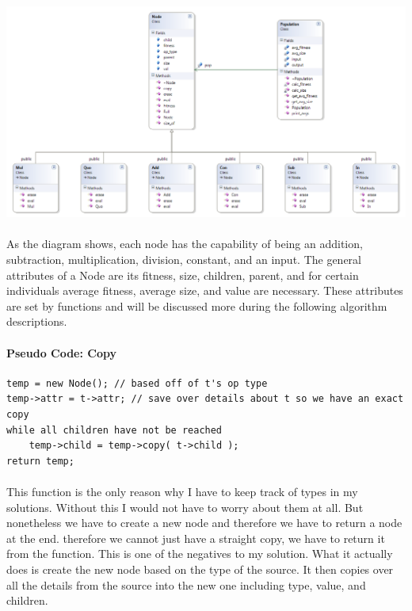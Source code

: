 \documentclass[paper=a4, fontsize=11pt]{scrartcl} %
\numberwithin{equation}{section} %
\numberwithin{figure}{section} %
\numberwithin{table}{section} %
\begin{document}
\includegraphics[scale=.5]{ClassDiagram}

\paragraph{} As the diagram shows, each node has the capability of being an addition, subtraction, multiplication, division, constant, and an input. The general attributes of a Node are its fitness, size, children, parent, and for certain individuals average fitness, average size, and value are necessary. These attributes are set by functions and will be discussed more during the following algorithm descriptions.

\paragraph{Pseudo Code: Copy}
\begin{verbatim}
temp = new Node(); // based off of t's op type
temp->attr = t->attr; // save over details about t so we have an exact copy
while all children have not be reached
    temp->child = temp->copy( t->child );
return temp;
\end{verbatim}

\paragraph{} This function is the only reason why I have to keep track of types in my solutions. Without this I would not have to worry about them at all. But nonetheless we have to create a new node and therefore we have to return a node at the end. therefore we cannot just have a straight copy, we have to return it from the function. This is one of the negatives to my solution. What it actually does is create the new node based on the type of the source. It then copies over all the details from the source into the new one including type, value, and children.
\end{document}
